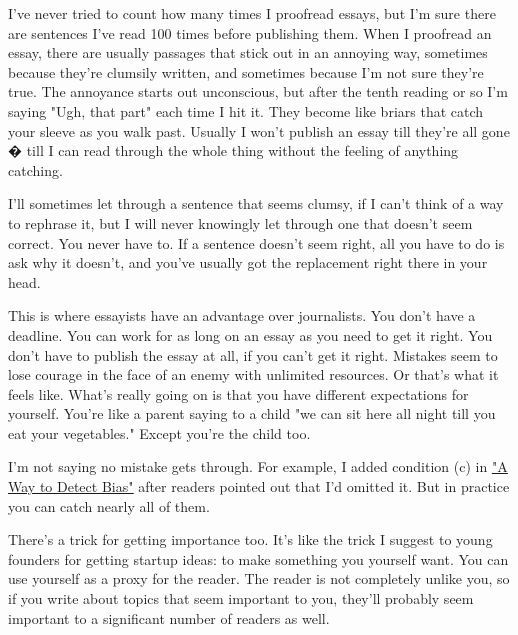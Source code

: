 I've never tried to
                  count how many times I proofread essays, but I'm sure there
                  are sentences I've read 100 times before publishing them. When
                  I proofread an essay, there are usually passages that stick
                  out in an annoying way, sometimes because they're clumsily
                  written, and sometimes because I'm not sure they're true. The
                  annoyance starts out unconscious, but after the tenth reading
                  or so I'm saying "Ugh, that part" each time I hit it. They
                  become like briars that catch your sleeve as you walk past.
                  Usually I won't publish an essay till they're all gone � till
                  I can read through the whole thing without the feeling of
                  anything catching.

I'll sometimes let through a
                  sentence that seems clumsy, if I can't think of a way to
                  rephrase it, but I will never knowingly let through one that
                  doesn't seem correct. You never have to. If a sentence doesn't
                  seem right, all you have to do is ask why it doesn't, and
                  you've usually got the replacement right there in your
                  head.

This is where essayists have an advantage
                  over journalists. You don't have a deadline. You can work for
                  as long on an essay as you need to get it right. You don't
                  have to publish the essay at all, if you can't get it right.
                  Mistakes seem to lose courage in the face of an enemy with
                  unlimited resources. Or that's what it feels like. What's
                  really going on is that you have different expectations for
                  yourself. You're like a parent saying to a child "we can sit
                  here all night till you eat your vegetables." Except you're
                  the child too.

I'm not saying no mistake gets
                  through. For example, I added condition (c) in
                  \href{http://www.paulgraham.com/bias.html}{\underline{"A Way to Detect Bias"}} after
                  readers pointed out that I'd omitted it. But in practice you
                  can catch nearly all of them.

There's a trick for
                  getting importance too. It's like the trick I suggest to young
                  founders for getting startup ideas: to make something you
                  yourself want. You can use yourself as a proxy for the reader.
                  The reader is not completely unlike you, so if you write about
                  topics that seem important to you, they'll probably seem
                  important to a significant number of readers as well.

